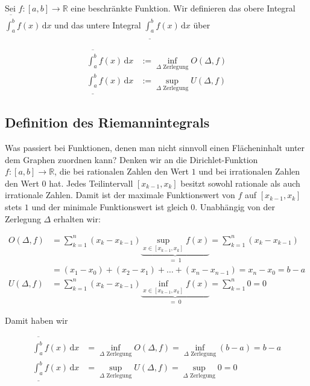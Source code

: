\documentclass[fontsize=9pt,
               parskip=half-,
               DIV=14,
               listof=chapterentry,
               tocflat]{scrbook}
\begin{document}
\begin{definition*}
Sei $f:[a,b]\to \mathbb {R} $ eine beschränkte Funktion. Wir definieren das obere Integral ${\overline {\int _{a}^{b}}}f(x)\,\mathrm {d} x$ und das untere Integral ${\underline {\int _{a}^{b}}}f(x)\,\mathrm {d} x$ über

\begin{align*}
{\overline {\int _{a}^{b}}}f(x)\,\mathrm {d} x&:=\inf _{\Delta {\text{ Zerlegung}}}O(\Delta ,f)\\[0.3em]{\underline {\int _{a}^{b}}}f(x)\,\mathrm {d} x&:=\sup _{\Delta {\text{ Zerlegung}}}U(\Delta ,f)
\end{align*}

\end{definition*}

\subsection{Definition des Riemannintegrals}

Was passiert bei Funktionen, denen man nicht sinnvoll einen Flächeninhalt unter dem Graphen zuordnen kann? Denken wir an die Dirichlet-Funktion $f:[a,b]\to \mathbb {R} $, die bei rationalen Zahlen den Wert $1$ und bei irrationalen Zahlen den Wert $0$ hat. Jedes Teilintervall $[x_{k-1},x_{k}]$ besitzt sowohl rationale als auch irrationale Zahlen. Damit ist der maximale Funktionswert von $f$ auf $[x_{k-1},x_{k}]$ stets $1$ und der minimale Funktionswert ist gleich $0$. Unabhängig von der Zerlegung $\Delta $ erhalten wir:

\begin{align*}
O(\Delta ,f)&=\sum _{k=1}^{n}(x_{k}-x_{k-1})\underbrace {\sup _{x\in [x_{k-1},x_{k}]}f(x)} _{=\ 1}=\sum _{k=1}^{n}(x_{k}-x_{k-1})\\[0.5em]&=(x_{1}-x_{0})+(x_{2}-x_{1})+\ldots +(x_{n}-x_{n-1})=x_{n}-x_{0}=b-a\\[0.5em]U(\Delta ,f)&=\sum _{k=1}^{n}(x_{k}-x_{k-1})\underbrace {\inf _{x\in [x_{k-1},x_{k}]}f(x)} _{=\ 0}=\sum _{k=1}^{n}0=0
\end{align*}

Damit haben wir

\begin{align*}
{\overline {\int _{a}^{b}}}f(x)\,\mathrm {d} x&=\inf _{\Delta {\text{ Zerlegung}}}O(\Delta ,f)=\inf _{\Delta {\text{ Zerlegung}}}(b-a)=b-a\\[0.5em]{\underline {\int _{a}^{b}}}f(x)\,\mathrm {d} x&=\sup _{\Delta {\text{ Zerlegung}}}U(\Delta ,f)=\sup _{\Delta {\text{ Zerlegung}}}0=0
\end{align*}
\end{document}
